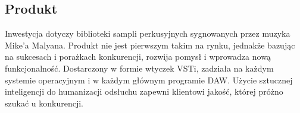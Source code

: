 \documentclass[12pt]{article}
\begin{document}





\subsection{Produkt}

Inwestycja dotyczy biblioteki sampli perkusyjnych sygnowanych przez muzyka
Mike'a Malyana. Produkt nie jest pierwszym takim na rynku, jednakże bazując na
sukcesach i porażkach konkurencji, rozwija pomysł i wprowadza nową
funkcjonalność. Dostarczony w formie wtyczek VSTi, zadziała na każdym systemie
operacyjnym i w każdym głównym programie DAW. Użycie sztucznej inteligencji do
humanizacji odsłuchu zapewni klientowi jakość, której próżno szukać u
konkurencji.
\end{document}
